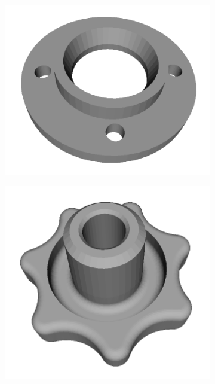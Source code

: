 \begin{figure}
\begin{subfigure}[t]{0.23\linewidth}
	\end{subfigure}
	\begin{subfigure}[t]{0.23\linewidth} \centering
		\includegraphics[width=1\linewidth]{./fig/eval/toshiba_flange1.png}
	\end{subfigure}
	\begin{subfigure}[t]{0.23\linewidth} \centering
		\includegraphics[width=1\linewidth]{./fig/eval/toshiba_knob1.png}

\end{subfigure}
\end{figure}
